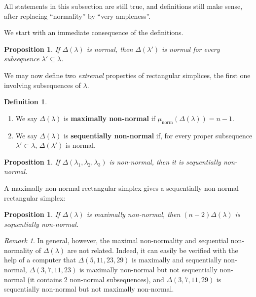 \documentclass[a4paper,11pt]{amsart}
\theoremstyle{plain}
\newtheorem{proposition}[theorem]{Proposition}
\theoremstyle{definition}
\newtheorem{definition}[theorem]{Definition}
\theoremstyle{remark}
\newtheorem{remark}[theorem]{Remark}
\DeclareMathOperator{\norm}{norm}
\begin{document}
All statements in this subsection are still true, and definitions still make sense, after replacing ``normality'' by ``very ampleness''.

We start with an immediate consequence of the definitions.

\begin{proposition}\label{proposition:normal-implies-normal-subsequences}
    If $\Delta(\lambda)$ is normal, then $\Delta(\lambda')$ is normal for every subsequence $\lambda' \subseteq \lambda$.
\end{proposition}

We may now define two \emph{extremal} properties of rectangular simplices, the first one involving subsequences of $\lambda$.

\begin{definition}

    \begin{enumerate}[1.]
        \item We say $\Delta(\lambda)$ is \textbf{maximally non-normal} if $\mu_{\norm}(\Delta(\lambda)) = n - 1$.
        \item We say $\Delta(\lambda)$ is \textbf{sequentially non-normal} if, for every proper subsequence $\lambda' \subset \lambda$, $\Delta(\lambda')$ is normal.
    \end{enumerate}
\end{definition}

\begin{proposition}
    If $\Delta(\lambda_1, \lambda_2, \lambda_3)$ is non-normal, then it is sequentially non-normal.
\end{proposition}

A maximally non-normal rectangular simplex gives a sequentially non-normal rectangular simplex:

\begin{proposition}
    If $\Delta(\lambda)$ is maximally non-normal, then $(n - 2) \Delta(\lambda)$ is sequentially non-normal.
\end{proposition}

\begin{remark}
    In general, however, the maximal non-normality and sequential non-normality of $\Delta(\lambda)$ are not related. Indeed, it can easily be verified with the help of a computer that $\Delta(5, 11, 23, 29)$ is maximally and sequentially non-normal, $\Delta(3, 7, 11, 23)$ is maximally non-normal but not sequentially non-normal (it contains $2$ non-normal subsequences), and $\Delta(3, 7, 11, 29)$ is sequentially non-normal but not maximally non-normal.
\end{remark}
\end{document}

